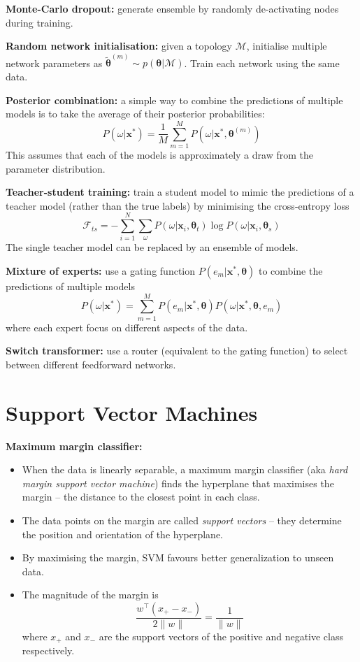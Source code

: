 \documentclass[12pt]{article}
\begin{document}
\textbf{Monte-Carlo dropout:} generate ensemble by randomly de-activating nodes during training.

\textbf{Random network initialisation:} given a topology $\mathcal{M}$, initialise multiple network parameters as $\tilde{\boldsymbol{\theta}}^{(m)} \sim p(\boldsymbol{\theta} | \mathcal{M})$. Train each network using the same data.

\textbf{Posterior combination:} a simple way to combine the predictions of multiple models is to take the average of their posterior probabilities:
$$
P(\omega | \boldsymbol{x}^*) = \frac{1}{M} \sum_{m=1}^M P(\omega | \boldsymbol{x}^*, \boldsymbol{\theta}^{(m)})
$$
This assumes that each of the models is approximately a draw from the parameter distribution.

\textbf{Teacher-student training:} train a student model to mimic the predictions of a teacher model (rather than the true labels) by minimising the cross-entropy loss
$$
\mathcal{F}_{ts} = - \sum_{i=1}^N \sum_{\omega} P(\omega | \boldsymbol{x}_i, \boldsymbol{\theta}_t) \log P(\omega | \boldsymbol{x}_i, \boldsymbol{\theta}_s)
$$
The single teacher model can be replaced by an ensemble of models.

\textbf{Mixture of experts:} use a gating function $P(e_m |\boldsymbol{x}^*, \boldsymbol{\theta})$ to combine the predictions of multiple models
$$
P(\omega | \boldsymbol{x}^*) = \sum_{m=1}^M P(e_m |\boldsymbol{x}^*, \boldsymbol{\theta}) P(\omega | \boldsymbol{x}^*, \boldsymbol{\theta}, e_m)
$$
where each expert focus on different aspects of the data.

\textbf{Switch transformer:} use a router (equivalent to the gating function) to select between different feedforward networks.

\section{Support Vector Machines}
\textbf{Maximum margin classifier:}
\begin{itemize}
\item When the data is linearly separable, a maximum margin classifier (aka \textit{hard margin support vector machine}) finds the hyperplane that maximises the margin -- the distance to the closest point in each class.
\item The data points on the margin are called \textit{support vectors} -- they determine the position and orientation of the hyperplane. 
\item By maximising the margin, SVM favours better generalization to unseen data.
\item The magnitude of the margin is
$$
\frac{w^\top (x_+ - x_-)}{2\|w\|} = \frac{1}{\|w\|}
$$
where $x_+$ and $x_-$ are the support vectors of the positive and negative class respectively.
\end{itemize}
\end{document}
